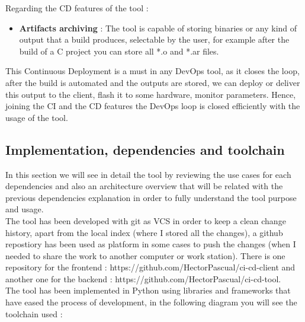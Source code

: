 \documentclass{article}
\begin{document}
Regarding the CD features of the tool :

\begin{itemize}
    \item \textbf{Artifacts archiving} : The tool is capable of storing binaries or any kind of output that a build produces, selectable by the user, for example after the build of a C project you can store all *.o and *.ar files.
\end{itemize}

This Continuous Deployment is a must in any DevOps tool, as it closes the loop, after the build is automated and the outputs are stored, we can deploy or deliver this output to the client, flash it to some hardware, monitor parameters. Hence, joining the CI and the CD features the DevOps loop is closed efficiently with the usage of the tool.


\newpage
\subsection{Implementation, dependencies and toolchain}

In this section we will see in detail the tool by reviewing the use cases for each dependencies and also an architecture overview that will be related with the previous dependencies explanation in order to fully understand the tool purpose and usage.
~\\

The tool has been developed with git as VCS in order to keep a clean change history, apart from the local index (where I stored all the changes), a github repostiory has been used as platform in some cases to push the changes (when I needed to share the work to another computer or work station). There is one repository for the frontend : https://github.com/HectorPascual/ci-cd-client and another one for the backend : https://github.com/HectorPascual/ci-cd-tool.
~\\

The tool has been implemented in Python using libraries and frameworks that have eased the process of development, in the following diagram you will see the toolchain used :
~\\
\end{document}
